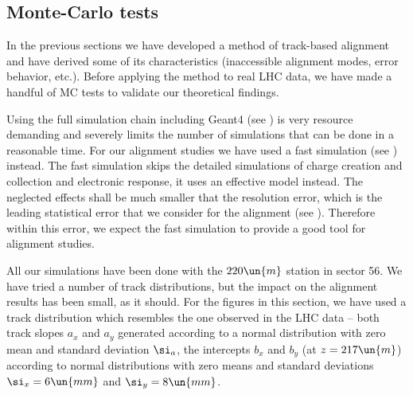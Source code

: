 \subsection[al mc tests]{Monte-Carlo tests}

In the previous sections we have developed a method of track-based alignment and have derived some of its characteristics (inaccessible alignment modes, error behavior, etc.). Before applying the method to real LHC data, we have made a handful of MC tests to validate our theoretical findings.

Using the full simulation chain including Geant4 (see ) is very resource demanding and severely limits the number of simulations that can be done in a reasonable time. For our alignment studies we have used a fast simulation (see ) instead. The fast simulation skips the detailed simulations of charge creation and collection and electronic response, it uses an effective model instead. The neglected effects shall be much smaller that the resolution error, which is the leading statistical error that we consider for the alignment (see ). Therefore within this error, we expect the fast simulation to provide a good tool for alignment studies.

All our simulations have been done with the $220\un{m}$ station in sector 56. We have tried a number of track distributions, but the impact on the alignment results has been small, as it should. For the figures in this section, we have used a track distribution which resembles the one observed in the LHC data -- both track slopes $a_x$ and $a_y$ generated according to a normal distribution with zero mean and standard deviation $\si_a$, the intercepts $b_x$ and $b_y$ (at $z=217\un{m}$) according to normal distributions with zero means and standard deviations $\si_x = 6\un{mm}$ and $\si_y= 8\un{mm}$.

